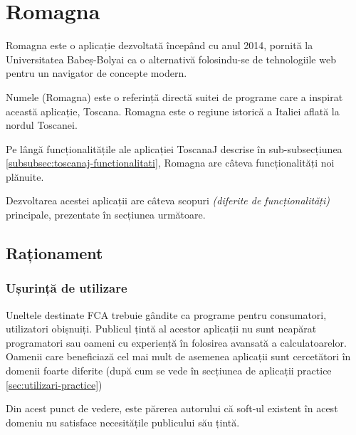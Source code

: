 \documentclass[12pt, a4paper, twoside, romanian]{teza-upb}
\begin{document}
\chapter{Romagna}

  Romagna este o aplicație dezvoltată începând cu anul 2014, pornită la Universitatea Babeș-Bolyai ca o alternativă folosindu-se de tehnologiile web pentru un navigator de concepte modern.

  Numele (Romagna) este o referință directă suitei de programe care a inspirat această aplicație, Toscana. Romagna este o regiune istorică a Italiei aflată la nordul Toscanei. 

  Pe lângă funcționalitățile ale aplicației ToscanaJ descrise în sub-subsecțiunea \ref{subsubsec:toscanaj-functionalitati}, Romagna are câteva funcționalități noi plănuite.

  Dezvoltarea acestei aplicații are câteva scopuri \textit{(diferite de funcționalități)} principale, prezentate în secțiunea următoare.

  \section{Raționament}
  \label{sec:rationament}

    \subsection{Ușurință de utilizare}
    \label{subsec:usurinta-de-utilizare}
      Uneltele destinate FCA trebuie gândite ca programe pentru consumatori, utilizatori obișnuiți. Publicul țintă al acestor aplicații nu sunt neapărat programatori sau oameni cu experiență în folosirea avansată a calculatoarelor. Oamenii care beneficiază cel mai mult de asemenea aplicații sunt cercetători în domenii foarte diferite (după cum se vede în secțiunea de aplicații practice \ref{sec:utilizari-practice})

      Din acest punct de vedere, este părerea autorului că soft-ul existent în acest domeniu nu satisface necesitățile publicului său țintă. 
\end{document}
